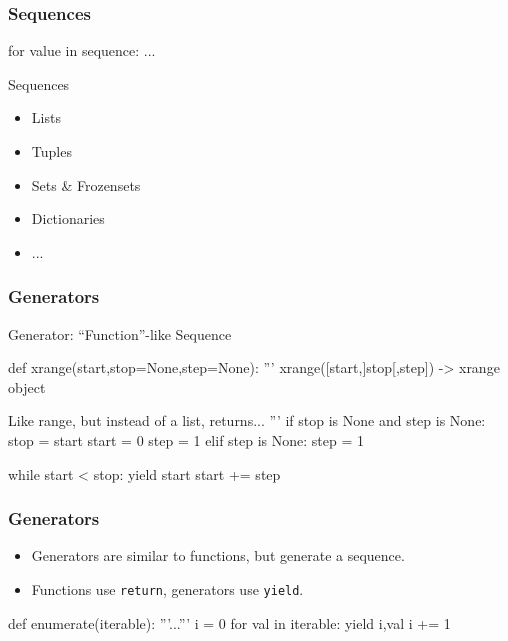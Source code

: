 \begin{frame}[fragile]
\frametitle{Sequences}

\begin{python}
for value in sequence:
    ...
\end{python}

\begin{block}{Sequences}
\begin{itemize}
\item Lists
\item Tuples
\item Sets \& Frozensets
\item Dictionaries
\item ...
\end{itemize}
\end{block}
\end{frame}


\begin{frame}[fragile]
\frametitle{Generators}

\begin{block}{Generator: ``Function''-like Sequence}

\begin{python}
def xrange(start,stop=None,step=None):
    '''
    xrange([start,]stop[,step]) -> xrange object

    Like range, but instead of a list, returns...
    '''
    if stop is None and step is None:
        stop = start
        start = 0
        step = 1
    elif step is None:
        step = 1

    while start < stop:
        yield start
        start += step
\end{python}
\end{block}

\end{frame}

\begin{frame}[fragile]
\frametitle{Generators}

\begin{itemize}
\item Generators are similar to functions, but generate a sequence.
\item Functions use \lstinline{return}, generators use \lstinline{yield}.
\end{itemize}
\end{frame}

\begin{frame}[fragile]
\begin{python}
def enumerate(iterable):
    '''...'''
    i = 0
    for val in iterable:
        yield i,val
        i += 1
\end{python}
\end{frame}

